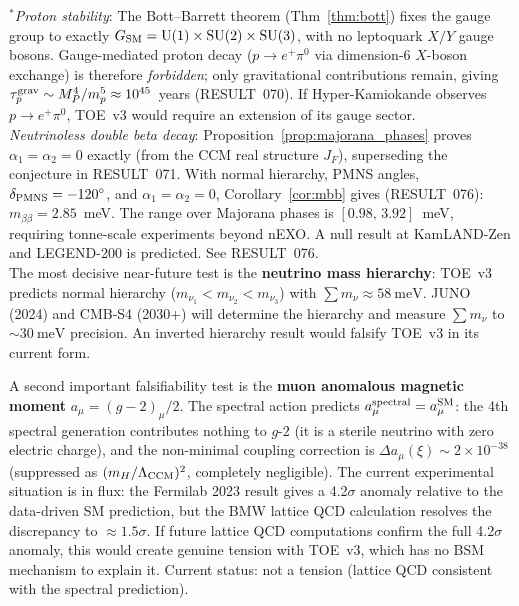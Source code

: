 \documentclass[12pt]{article}
\theoremstyle{definition}
\theoremstyle{remark}
\begin{document}
${}^*$\emph{Proton stability}: The Bott--Barrett theorem (Thm~\ref{thm:bott}) fixes the gauge group
to exactly $G_{\rm SM} = \mathrm{U}(1)\times\mathrm{SU}(2)\times\mathrm{SU}(3)$, with no leptoquark
$X/Y$ gauge bosons.  Gauge-mediated proton decay ($p\to e^+\pi^0$ via dimension-6
$X$-boson exchange) is therefore \emph{forbidden}; only gravitational contributions
remain, giving $\tau_p^{\rm grav} \sim M_P^4/m_p^5 \approx 10^{45}$~years (RESULT~070).
If Hyper-Kamiokande observes $p\to e^+\pi^0$, TOE~v3 would require an extension of its
gauge sector.\\[4pt]
\emph{Neutrinoless double beta decay}: Proposition~\ref{prop:majorana_phases} proves
$\alpha_1=\alpha_2=0$ exactly (from the CCM real structure $J_F$), superseding the
conjecture in RESULT~071.  With normal hierarchy, PMNS angles, $\delta_{\rm PMNS}=-120^\circ$,
and $\alpha_1=\alpha_2=0$, Corollary~\ref{cor:mbb} gives (RESULT~076):
$m_{\beta\beta} = 2.85$~meV.
The range over Majorana phases is $[0.98,\, 3.92]$~meV, requiring tonne-scale
experiments beyond nEXO.  A null result at KamLAND-Zen and LEGEND-200 is predicted.
See RESULT~076.\\[4pt]

The most decisive near-future test is the \textbf{neutrino mass hierarchy}:
TOE~v3 predicts normal hierarchy ($m_{\nu_1} < m_{\nu_2} < m_{\nu_3}$) with
$\sum m_\nu \approx 58\ \mathrm{meV}$.  JUNO (2024) and CMB-S4 (2030+) will
determine the hierarchy and measure $\sum m_\nu$ to $\sim 30\ \mathrm{meV}$
precision.  An inverted hierarchy result would falsify TOE~v3 in its current form.

A second important falsifiability test is the \textbf{muon anomalous magnetic moment}
$a_\mu = (g-2)_\mu/2$.  The spectral action predicts $a_\mu^{\rm spectral} = a_\mu^{\rm SM}$:
the 4th spectral generation contributes nothing to $g$-$2$ (it is a sterile neutrino with
zero electric charge), and the non-minimal coupling correction is $\Delta a_\mu(\xi) \sim
2\times 10^{-38}$ (suppressed as $(m_H/\Lambda_{\rm CCM})^2$, completely negligible).
The current experimental situation is in flux: the Fermilab 2023 result gives a 4.2$\sigma$
anomaly relative to the data-driven SM prediction, but the BMW lattice QCD calculation
resolves the discrepancy to $\approx 1.5\sigma$.  If future lattice QCD computations confirm
the full 4.2$\sigma$ anomaly, this would create genuine tension with TOE~v3, which has no
BSM mechanism to explain it.  Current status: not a tension (lattice QCD consistent with
the spectral prediction).
\end{document}
